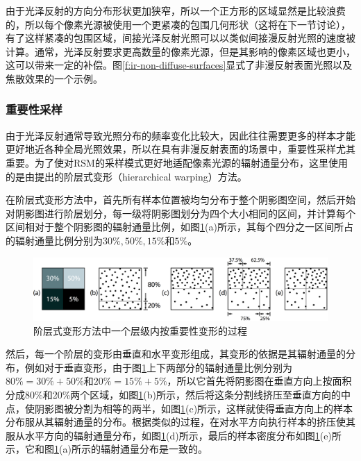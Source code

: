 由于光泽反射的方向分布形状更加狭窄，所以一个正方形的区域显然是比较浪费的，所以每个像素光源被使用一个更紧凑的包围几何形状（这将在下一节讨论），有了这样紧凑的包围区域，间接光泽反射光照可以以类似间接漫反射光照的速度被计算。通常，光泽反射要求更高数量的像素光源，但是其影响的像素区域也更小，这可以带来一定的补偿。图\ref{f:ir-non-diffuse-surfaces}显式了非漫反射表面光照以及焦散效果的一个示例。



\subsubsection{重要性采样}
由于光泽反射通常导致光照分布的频率变化比较大，因此往往需要更多的样本才能更好地近各种全局光照效果，所以在具有非漫反射表面的场景中，重要性采样尤其重要。为了使对RSM的采样模式更好地适配像素光源的辐射通量分布，这里使用的是由\cite{a:WaveletImportanceSampling}提出的阶层式变形（hierarchical warping）方法。 

在阶层式变形方法中，首先所有样本位置被均匀分布于整个阴影图空间，然后开始对阴影图进行阶层划分，每一级将阴影图划分为四个大小相同的区间，并计算每个区间相对于整个阴影图的辐射通量比例，如图\ref{f:ir-hierarchical-warping}(a)所示，其每个四分之一区间所占的辐射通量比例分别为$30\%,50\%,15\%和5\%$。

\begin{figure}
\begin{fullwidth}
	\includegraphics[width=1.0\thewidth]{figures/ir/ir-3-1}
	\caption{阶层式变形方法中一个层级内按重要性变形的过程}
	\label{f:ir-hierarchical-warping}
\end{fullwidth}
\end{figure}

然后，每一个阶层的变形由垂直和水平变形组成，其变形的依据是其辐射通量的分布，例如对于垂直变形，由于图\ref{f:ir-hierarchical-warping}上下两部分的辐射通量比例分别为$80\%=30\%+50\%$和$20\%=15\%+5\%$，所以它首先将阴影图在垂直方向上按面积分成80\%和20\%两个区域，如图\ref{f:ir-hierarchical-warping}(b)所示，然后将这条分割线挤压至垂直方向的中点，使阴影图被分割为相等的两半，如图\ref{f:ir-hierarchical-warping}(c)所示，这样就使得垂直方向上的样本分布服从其辐射通量的分布。根据类似的过程，在对水平方向执行样本的挤压使其服从水平方向的辐射通量分布，如图\ref{f:ir-hierarchical-warping}(d)所示，最后的样本密度分布如图\ref{f:ir-hierarchical-warping}(e)所示，它和图\ref{f:ir-hierarchical-warping}(a)所示的辐射通量分布是一致的。

